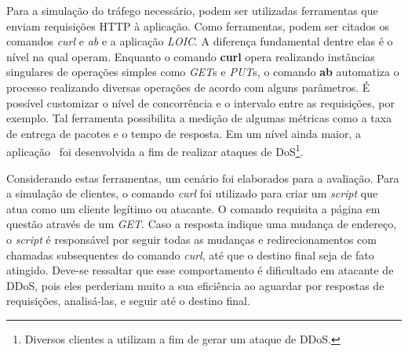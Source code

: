 
Para a simulação do tráfego necessário, podem ser utilizadas ferramentas que enviam requisições HTTP à aplicação. Como ferramentas, podem ser citados os comandos \emph{curl} e \emph{ab} e a aplicação \emph{LOIC}. A diferença fundamental dentre elas é o nível na qual operam. Enquanto o comando \textbf{curl} opera realizando instâncias singulares de operações simples como \emph{GET}s e \emph{PUT}s, o comando \textbf{ab} automatiza o processo realizando diversas operações de acordo com alguns parâmetros. É possível customizar o nível de concorrência e o intervalo entre as requisições, por exemplo. Tal ferramenta possibilita a medição de algumas métricas como a taxa de entrega de pacotes e o tempo de resposta. Em um nível ainda maior, a aplicação~\cite{loic} foi desenvolvida a fim de realizar ataques de DoS\footnote{Diversos clientes a utilizam a fim de gerar um ataque de DDoS.}. %

Considerando estas ferramentas, um cenário foi elaborados para a avaliação. 
%
Para a simulação de clientes, o comando \emph{curl} foi utilizado para criar um \emph{script} que atua como um cliente legítimo ou atacante. O comando requisita a página em questão através de um \emph{GET}. Caso a resposta indique uma mudança de endereço, o \emph{script} é responsável por seguir todas as mudanças e redirecionamentos com chamadas subsequentes do comando \emph{curl}, até que o destino final seja de fato atingido. Deve-se ressaltar que esse comportamento é dificultado em atacante de DDoS, pois eles perderiam muito a sua eficiência ao aguardar por respostas de requisições, analisá-las, e seguir até o destino final.

